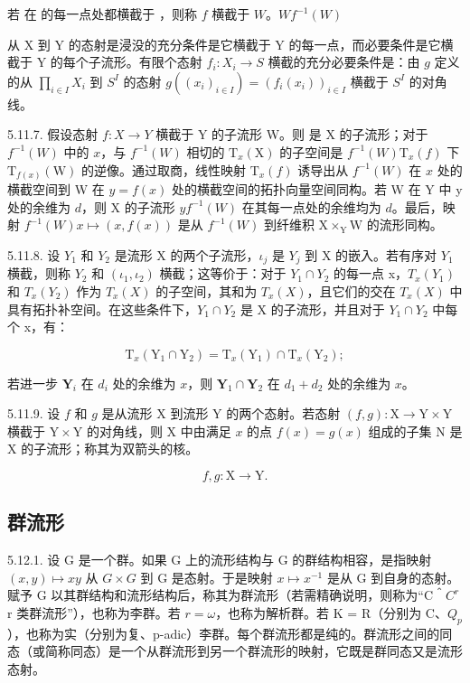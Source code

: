 若  在  的每一点处都横截于 ，则称 \(f\) 横截于 \(W\)。\(W\)\(f^{-1}(W)\)

从 X 到 Y 的态射是浸没的充分条件是它横截于 Y 的每一点，而必要条件是它横截于 Y 的每个子流形。有限个态射 \(f_{i}:X_{i}\to S\) 横截的充分必要条件是：由 \(g\) 定义的从 \(\prod_{i\in I}X_{i}\) 到 \(S^{I}\) 的态射 \(g((x_{i})_{i\in I})=(f_{i}(x_{i}))_{i\in I}\) 横截于 \(S^{I}\) 的对角线。

5.11.7. 假设态射 \(f:X\to Y\) 横截于 Y 的子流形 W。则  是 X 的子流形；对于 \(f^{-1}(W)\) 中的 \(x\)，与 \(f^{-1}(W)\) 相切的 \(\mathrm{T}_{x}(\mathrm{X})\) 的子空间是 \(f^{-1}(W)\)\(\mathrm{T}_{x}(f)\) 下 \(\mathrm{T}_{f(x)}(\mathrm{W})\) 的逆像。通过取商，线性映射 \(\mathrm{T}_{x}(f)\) 诱导出从 \(f^{-1}(W)\) 在 \(x\) 处的横截空间到 W 在 \(y=f(x)\) 处的横截空间的拓扑向量空间同构。若 W 在 Y 中 y 处的余维为 \(d\)，则 X 的子流形 \(y\)\(f^{-1}(W)\) 在其每一点处的余维均为 \(d\)。最后，映射 \(f^{-1}(W)\)\(x\mapsto(x,f(x))\) 是从 \(f^{-1}(W)\) 到纤维积 \(\mathrm{X}\times_{\mathrm{Y}}\mathrm{W}\) 的流形同构。

5.11.8. 设 \(Y_{1}\) 和 \(Y_{2}\) 是流形 X 的两个子流形，\(\iota_{j}\) 是 \(Y_{j}\) 到 X 的嵌入。若有序对 \(Y_{1}\) 横截，则称 \(Y_{2}\) 和 \((\iota_{1},\iota_{2})\) 横截；这等价于：对于 \(Y_{1}\cap Y_{2}\) 的每一点 x，\(T_{x}(Y_{1})\) 和 \(T_{x}(Y_{2})\) 作为 \(T_{x}(X)\) 的子空间，其和为 \(T_{x}(X)\)，且它们的交在 \(T_{x}(X)\) 中具有拓扑补空间。在这些条件下，\(Y_{1}\cap Y_{2}\) 是 X 的子流形，并且对于 \(Y_{1}\cap Y_{2}\) 中每个 x，有：

\[
\mathrm{T} _ {x} (\mathrm{Y} _ {1} \cap \mathrm{Y} _ {2}) = \mathrm{T} _ {x} (\mathrm{Y} _ {1}) \cap \mathrm{T} _ {x} (\mathrm{Y} _ {2});
\]

若进一步 \(\mathbf{Y}_i\) 在 \(d_i\) 处的余维为 \(x\)，则 \(\mathbf{Y}_1 \cap \mathbf{Y}_2\) 在 \(d_1 + d_2\) 处的余维为 \(x\)。

5.11.9. 设 \(f\) 和 \(g\) 是从流形 X 到流形 Y 的两个态射。若态射 \((f,g):\mathrm{X}\to\mathrm{Y}\times\mathrm{Y}\) 横截于 \(\mathrm{Y}\times\mathrm{Y}\) 的对角线，则 X 中由满足 \(x\) 的点 \(f(x)=g(x)\) 组成的子集 N 是 X 的子流形；称其为双箭头的核。

\[
f, g: \mathrm{X} \longrightarrow \mathrm{Y}.
\]

\subsection{群流形}

5.12.1. 设 G 是一个群。如果 G 上的流形结构与 G 的群结构相容，是指映射 \((x, y) \mapsto xy\) 从 \(G \times G\) 到 G 是态射。于是映射 \(x \mapsto x^{-1}\) 是从 G 到自身的态射。赋予 G 以其群结构和流形结构后，称其为群流形（若需精确说明，则称为“C＾\(C^{r}\)r 类群流形”），也称为李群。若 \(r = \omega\)，也称为解析群。若 K = R（分别为 C、\(Q_{p}\)），也称为实（分别为复、p-adic）李群。每个群流形都是纯的。群流形之间的同态（或简称同态）是一个从群流形到另一个群流形的映射，它既是群同态又是流形态射。

